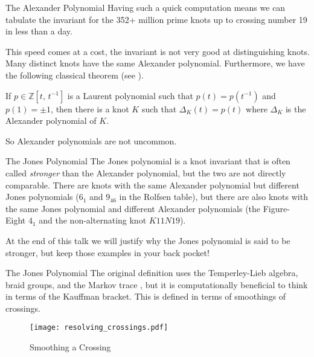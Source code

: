\documentclass{beamer}
\begin{document}
    \begin{frame}{The Alexander Polynomial}
        Having such a quick computation means we can tabulate the invariant
        for the 352+ million prime knots up to crossing number 19 in less than
        a day.
        \par\hfill\par
        This speed comes at a cost, the invariant is not very good at
        distinguishing knots. Many distinct knots have the same Alexander
        polynomial. Furthermore, we have the following classical theorem
        (see \cite{KawauchiSurveyKnotTheory1996}).
        \begin{theorem}
            If $p\in\mathbb{Z}[t,\,t^{-1}]$ is a Laurent polynomial such that
            $p(t)=p(t^{-1})$ and $p(1)=\pm{1}$, then there is a knot $K$
            such that $\Delta_{K}(t)=p(t)$ where $\Delta_{K}$ is the
            Alexander polynomial of $K$.
        \end{theorem}
        So Alexander polynomials are not uncommon.
    \end{frame}
    \begin{frame}{The Jones Polynomial}
        The Jones polynomial is a knot invariant that is often called
        \textit{stronger} than the Alexander polynomial, but the two are not
        directly comparable. There are knots with the same Alexander polynomial
        but different Jones polynomials ($6_{1}$ and $9_{46}$ in the Rolfsen
        table), but there are also knots with the
        same Jones polynomial and different Alexander polynomials
        (the Figure-Eight $4_{1}$ and the non-alternating knot
        $K11N19$).
        \par\hfill\par
        At the end of this talk we will justify why the Jones polynomial is
        said to be stronger, but keep those examples in your back pocket!
    \end{frame}
    \begin{frame}{The Jones Polynomial}
        The original definition uses the Temperley-Lieb algebra, braid groups,
        and the Markov trace \cite{JonesJonesPolyForDummies}, but it is
        computationally
        beneficial to think in terms of the Kauffman bracket. This is defined
        in terms of smoothings of crossings.
        \par\hfill\par
        \begin{figure}
            \centering
            \texttt{[image: resolving\_crossings.pdf]}
            \caption{Smoothing a Crossing}
        \end{figure}
    \end{frame}
\end{document}
